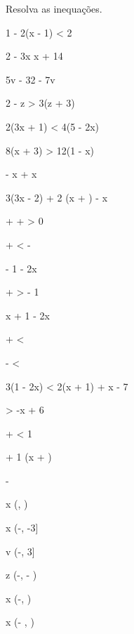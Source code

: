 \begin{exercicio}
  Resolva as inequações.
  \begin{mathlist}[1]
    \item 1 - 2(x - 1) < 2
    \item 2 - 3x \geq x + 14
    \item 5v - 32  - 7v
    \item 2 - z > 3(z + 3)
    \item 2(3x + 1) < 4(5 - 2x)
    \item 8(x + 3) > 12(1 - x)
    \item {} -  x \geq {} + x
    \item 3(3x - 2) + 2 \left(x +  \right)  - x
    \item {} +  +  > 0
    \item {} +  <  - 
    \item {} - 1 \geq {} - 2x
    \item {} +  >  - 1
    \item {}x + 1 \leq {} - 2x
    \item {} +  < 
    \item {} -  < 
    \item 3(1 - 2x) < 2(x + 1) + x - 7
    \item {} > -x + 6
    \item {} +  < 1
    \item {} + 1  \left(x +  \right)
    \item {} -  
  \end{mathlist}
  \begin{answers}
      \begin{mathlist}[3]
        \item x \in \left(, \infty\right)
        \item x \in \left(-\infty, -3\right]
        \item v \in \left(-\infty, 3\right]
        \item z \in \left(-\infty, - \right)
        \item x \in \left(-\infty, \right)
        \item x \in \left(- , \infty\right)

\end{mathlist}
\end{answers}
\end{exercicio}
